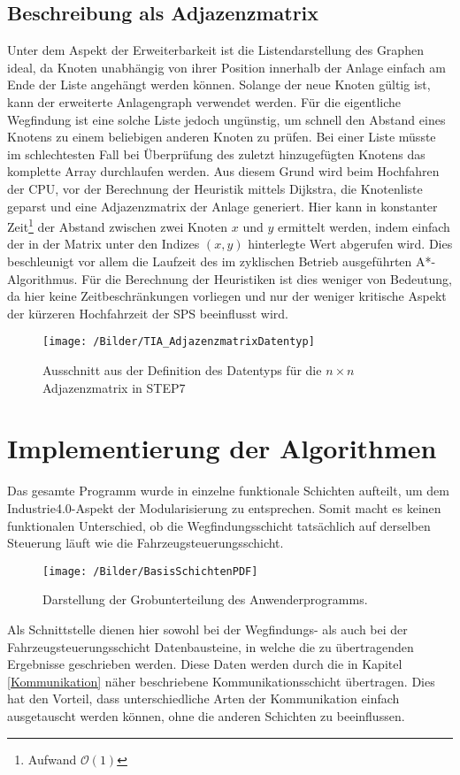 		\subsection{Beschreibung als Adjazenzmatrix}
			\label{Adjazenzmatrix}
			Unter dem Aspekt der Erweiterbarkeit ist die Listendarstellung des Graphen ideal, da Knoten unabhängig von ihrer Position innerhalb der Anlage einfach am Ende der Liste angehängt werden können. Solange der neue Knoten gültig ist, kann der erweiterte Anlagengraph verwendet werden. Für die eigentliche Wegfindung ist eine solche Liste jedoch ungünstig, um schnell den Abstand eines Knotens zu einem beliebigen anderen Knoten zu prüfen. Bei einer Liste müsste im schlechtesten Fall bei Überprüfung des zuletzt hinzugefügten Knotens das komplette Array durchlaufen werden. Aus diesem Grund wird beim Hochfahren der CPU, vor der Berechnung der Heuristik mittels Dijkstra, die Knotenliste geparst und eine Adjazenzmatrix der Anlage generiert. Hier kann in konstanter Zeit\footnote{Aufwand $\mathcal{O}(1)$} der Abstand zwischen zwei Knoten $x$ und $y$ ermittelt werden, indem einfach der in der Matrix unter den Indizes $(x,y)$ hinterlegte Wert abgerufen wird. Dies beschleunigt vor allem die Laufzeit des im zyklischen Betrieb ausgeführten A*-Algorithmus. Für die Berechnung der Heuristiken ist dies weniger von Bedeutung, da hier keine Zeitbeschränkungen vorliegen und nur der weniger kritische Aspekt der kürzeren Hochfahrzeit der \ac{SPS} beeinflusst wird.
			
			\begin{figure}
				\centering
				\texttt{[image: /Bilder/TIA\_AdjazenzmatrixDatentyp]}
				\vspace{0.2cm}
				\caption{Ausschnitt aus der Definition des Datentyps für die $n\times n$ Adjazenzmatrix in \ac{STEP7}}
			\end{figure}

	\section{Implementierung der Algorithmen}
		
	
		Das gesamte Programm wurde in einzelne funktionale Schichten aufteilt, um dem Industrie4.0-Aspekt der Modularisierung zu entsprechen. Somit macht es keinen funktionalen Unterschied, ob die Wegfindungsschicht tatsächlich auf derselben Steuerung läuft wie die Fahrzeugsteuerungsschicht.
		\begin{wrapfigure}{r}{5cm}
			\centering
			\texttt{[image: /Bilder/BasisSchichtenPDF]}
			\vspace{0.2cm}
			\caption{Darstellung der Grobunterteilung des Anwenderprogramms.}
		\end{wrapfigure}
		 Als Schnittstelle dienen hier sowohl bei der Wegfindungs- als auch bei der Fahrzeugsteuerungsschicht  Datenbausteine, in welche die zu übertragenden Ergebnisse geschrieben werden. Diese Daten werden durch die in Kapitel \ref{Kommunikation} näher beschriebene Kommunikationsschicht übertragen. Dies hat den Vorteil, dass unterschiedliche Arten der Kommunikation einfach ausgetauscht werden können, ohne die anderen Schichten zu beeinflussen.
		
